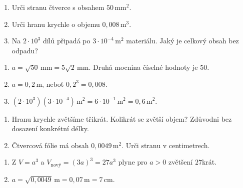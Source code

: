 \documentclass[11pt,a4paper]{article}
\begin{document}


\begin{zadaniReseniBox}[title={Procvičení},breakable=false]
\begin{enumerate}[label=\alph*)]
\item Urči stranu čtverce s obsahem $50\,\mathrm{mm}^2$.
\item Urči hranu krychle o objemu $0{,}008\,\mathrm m^3$.
\item Na $2\cdot10^3$ dílů připadá po $3\cdot10^{-4}\,\mathrm m^2$ materiálu. Jaký je celkový obsah bez odpadu?
\end{enumerate}
\tcblower
\begin{enumerate}[label=\alph*)]
\item $a=\sqrt{50}\,\mathrm{mm}=5\sqrt2\,\mathrm{mm}$. Druhá mocnina číselné hodnoty je $50$.
\item $a=0{,}2\,\mathrm m$, neboť $0{,}2^3=0{,}008$.
\item $(2\cdot10^3)(3\cdot10^{-4})\,\mathrm m^2=6\cdot10^{-1}\,\mathrm m^2=0{,}6\,\mathrm m^2$.
\end{enumerate}
\end{zadaniReseniBox}





\begin{zadaniReseniBox}[title={Rezerva: škálování a kontrola jednotek},breakable=false]
\begin{enumerate}[label=\alph*)]
\item Hranu krychle zvětšíme třikrát. Kolikrát se zvětší objem? Zdůvodni bez dosazení konkrétní délky.
\item Čtvercová fólie má obsah $0{,}0049\,\mathrm m^2$. Urči stranu v centimetrech.
\end{enumerate}
\tcblower
\begin{enumerate}[label=\alph*)]
\item Z $V=a^3$ a $V_{\mathrm{nový}}=(3a)^3=27a^3$ plyne pro $a>0$ zvětšení $27$krát.
\item $a=\sqrt{0{,}0049}\,\mathrm m=0{,}07\,\mathrm m=7\,\mathrm{cm}$.
\end{enumerate}
\end{zadaniReseniBox}
\end{document}
